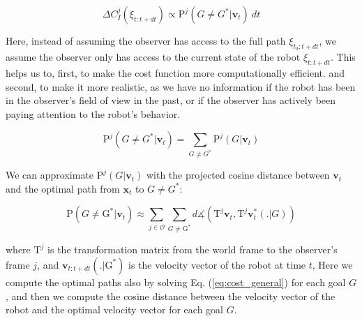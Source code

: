 \begin{equation}
    \label{eq:cost_leg}
    \Delta C_{I}^j(\xi_{t:t+dt}) \propto  \mathrm{P}^j(G \neq G^* | \mathbf{v}_t) ~dt
\end{equation}

\noindent
Here, instead of assuming the observer has access to the full path $\xi_{t_0:t+dt}$,
we assume the observer only has access to the current state of the robot $\xi_{t:t+dt}$.
%
%
This helps us to, first, to make the cost function more computationally efficient.
and second, to make it more realistic, as we have no information if the robot has been in the observer's field of view in the past,
or if the observer has actively been paying attention to the robot's behavior.

\noindent

\begin{equation}
    \label{eq:prob_leg}
    \mathrm{P}^j(G \neq G^* | \mathbf{v}_t) = \sum_{G \neq G^*} \mathrm{P}^j(G | \mathbf{v}_t)
\end{equation}

\noindent
We can approximate $\mathrm{P}^j(G | \mathbf{v}_t)$ with the projected cosine distance between $\mathbf{v}_t$ and the optimal path from $\mathbf{x}_t$ to $G \neq G^*$:

\begin{equation}
    \label{eq:prob_leg_approx}
    \mathrm{P}(G \neq \mathrm G^* | \mathbf{v}_t) \approx
                        \sum_{j \in \mathcal{O}}
                        \sum_{G \neq \mathrm G^*}  d \measuredangle(
                                                                        \mathrm T^j \mathbf{v}_t,
                                                                        \mathrm T^j \mathbf{v}^*_t(.|G))
\end{equation}

\noindent
where $\mathrm T^j$ is the transformation matrix from the world frame to the observer's frame $j$,
and $\mathbf{v}_{t:t+dt}(.|\mathrm G^*)$ is the velocity vector of the robot at time $t$,
Here we compute the optimal paths also by solving Eq. (\ref{eq:cost_general}) for each goal $G$,
and then we compute the cosine distance between the velocity vector of the robot and the optimal velocity vector for each goal $G$.


